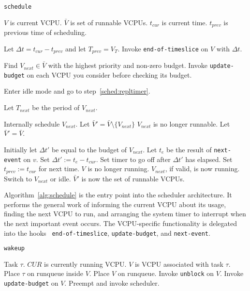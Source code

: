 \documentclass[twocolumn,10pt]{article}
\begin{document}
\begin{algorithm*}
  \caption{\tt schedule}\label{alg:schedule}
  \begin{algorithmic}[1]
    \REQUIRE $V$ is current VCPU.
    \REQUIRE $\bar V$ is set of runnable VCPUs.
    \REQUIRE $t_{cur}$ is current time.
    \REQUIRE $t_{prev}$ is previous time of scheduling.

    \STATE Let $\Delta t=t_{cur}-t_{prev}$ and let $T_{prev}=V_T$.
    \STATE Invoke {\tt end-of-timeslice} on $V$ with $\Delta t$.

    \STATE Find $V_{next}\in\bar V$ with the highest priority and
    non-zero budget.  Invoke {\tt update-budget} on each VCPU you
    consider before checking its budget.

    \STATE Enter idle mode and go to step~\ref{sched:repltimer}.
    \ENDIF

    \STATE Let $T_{next}$ be the period of $V_{next}$.

    \STATE Internally schedule $V_{next}$.
    \STATE Let $\bar V'=\bar V\setminus\{V_{next}\}$
    \STATE $V_{next}$ is no longer runnable.
    \ELSE
    \STATE Let $\bar V'=\bar V$.
    \ENDIF

    \STATE Initially let $\Delta t'$ be equal to the budget of $V_{next}$.
    \STATE Let $t_e$ be the result of {\tt next-event} on $v$.
    \STATE Set $\Delta t':=t_e-t_{cur}$.\ENDIF
    \ENDFOR
    \STATE Set timer to go off after $\Delta t'$ has elapsed.
    \STATE Set $t_{prev}:=t_{cur}$ for next time.
    \STATE $V$ is no longer running.  $V_{next}$, if valid, is now running.
    \STATE Switch to $V_{next}$ or idle.
    \ENSURE $\bar V'$ is now the set of runnable VCPUs.
  \end{algorithmic}
\end{algorithm*}

Algorithm~\ref{alg:schedule} is the entry point into the scheduler
architecture.  It performs the general work of informing the current
VCPU about its usage, finding the next VCPU to run, and arranging the
system timer to interrupt when the next important event occurs.  The
VCPU-specific functionality is delegated into the hooks {\tt
  end-of-timeslice}, {\tt update-budget}, and {\tt next-event}.

\begin{algorithm*}
  \caption {\tt wakeup}\label{alg:wakeup}
  \begin{algorithmic}[1]
    \REQUIRE Task $\tau$.
    \REQUIRE $CUR$ is currently running VCPU.
    \REQUIRE $V$ is VCPU associated with task $\tau$.
    \STATE Place $\tau$ on runqueue inside $V$.
    \STATE Place $V$ on runqueue.
    \STATE Invoke {\tt unblock} on $V$.
    \STATE Invoke {\tt update-budget} on $V$.
    \STATE Preempt and invoke scheduler.
    \ENDIF
  \end{algorithmic}
\end{algorithm*}
\end{document}
